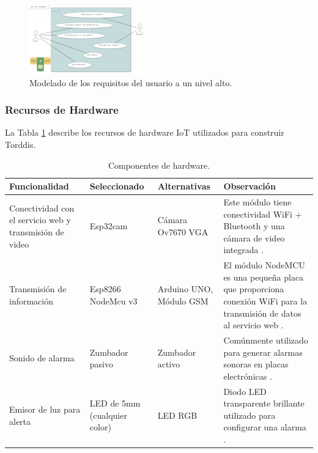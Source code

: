 				\begin{figure}[h]
					\centering
					\includegraphics[frame,scale=0.5, width=\linewidth]{figs/Figure_2}
					\caption{Modelado de los requisitos del usuario a un nivel alto.\label{fig:UseCaseDiagram}}
				\end{figure} 
				
				\subsubsection*{Recursos de Hardware}
					La Tabla \ref{table:hardware-components} describe los recursos de hardware IoT utilizados para construir Torddis. 
					
					\begin{table}[htb]
						\caption{Componentes de hardware.}
						\label{table:hardware-components}
						\centering
						\begin{tabular}{p{}p{0.15\textwidth}p{}p{}}
							\hline
							\multicolumn{1}{l}{\textbf{Funcionalidad}} & \multicolumn{1}{l}{\textbf{Seleccionado}} & \multicolumn{1}{l}{\textbf{Alternativas}} & \multicolumn{1}{l}{\textbf{Observación}} \\ \hline
							Conectividad con el servicio web y transmisión de video & Esp32cam & Cámara Ov7670 VGA & Este módulo tiene conectividad WiFi + Bluetooth y una cámara de video integrada \citep{CasasSanchez2022}. \\
							Transmisión de información & Esp8266 NodeMcu v3 & Arduino UNO, Módulo GSM & El módulo NodeMCU es una pequeña placa que proporciona conexión WiFi para la transmisión de datos al servicio web \citep{Barai2019}. \\
							Sonido de alarma & Zumbador pasivo & Zumbador activo & Comúnmente utilizado para generar alarmas sonoras en placas electrónicas \citep{Adebisi2023development}. \\
							Emisor de luz para alerta & LED de 5mm (cualquier color) & LED RGB & Diodo LED transparente brillante utilizado para configurar una alarma \citep{Upender2020}.  \\ \hline
						\end{tabular}
					\end{table}
				
